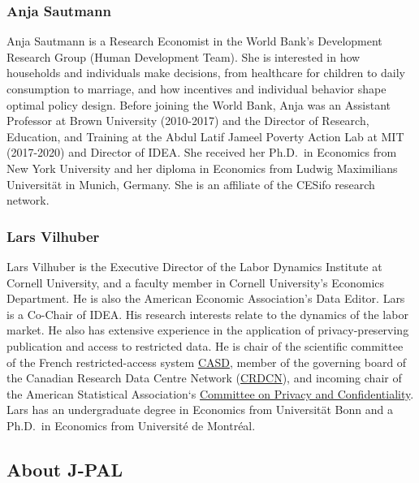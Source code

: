 \documentclass[
]{WileySix}
\begin{document}
\hypertarget{anja-sautmann}{%
\subsubsection*{Anja Sautmann}\label{anja-sautmann}}

Anja Sautmann is a Research Economist in the World Bank's Development Research Group (Human Development Team). She is interested in how households and individuals make decisions, from healthcare for children to daily consumption to marriage, and how incentives and individual behavior shape optimal policy design. Before joining the World Bank, Anja was an Assistant Professor at Brown University (2010-2017) and the Director of Research, Education, and Training at the Abdul Latif Jameel Poverty Action Lab at MIT (2017-2020) and Director of IDEA. She received her Ph.D.~in Economics from New York University and her diploma in Economics from Ludwig Maximilians Universität in Munich, Germany. She is an affiliate of the CESifo research network.

\hypertarget{lars-vilhuber}{%
\subsubsection*{Lars Vilhuber}\label{lars-vilhuber}}

Lars Vilhuber is the Executive Director of the Labor Dynamics Institute at Cornell University, and a faculty member in Cornell University's Economics Department. He is also the American Economic Association's Data Editor. Lars is a Co-Chair of IDEA. His research interests relate to the dynamics of the labor market. He also has extensive experience in the application of privacy-preserving publication and access to restricted data. He is chair of the scientific committee of the French restricted-access system \href{https://casd.eu}{CASD}, member of the governing board of the Canadian Research Data Centre Network (\href{https://crdcn.org}{CRDCN}), and incoming chair of the American Statistical Association`s \href{https://community.amstat.org/cpc/home}{Committee on Privacy and Confidentiality}. Lars has an undergraduate degree in Economics from Universität Bonn and a Ph.D.~in Economics from Université de Montréal.

\hypertarget{about-j-pal}{%
\subsection*{About J-PAL}\label{about-j-pal}}
\end{document}
